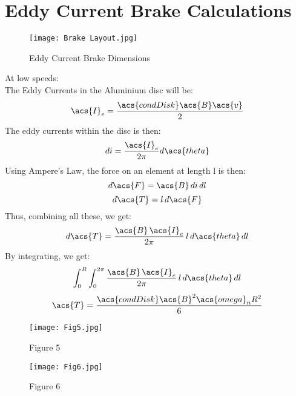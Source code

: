 \newpage
{} 
\setcounter{page}{1}
\appendix
\renewcommand\thechapter{A}

\chapter{Eddy Current Brake Calculations}

\begin{figure}[H]
	\begin{center}
		\texttt{[image: Brake Layout.jpg]}
		\caption{Eddy Current Brake Dimensions}
		\label{fig:EB}
	\end{center}
\end{figure}

\newpage

At low speeds:\\
The Eddy Currents in the Aluminium disc will be:
\[
\acs{I}_e = \frac{\acs{condDisk} \acs{B} \acs{v}}{2}
\]
The eddy currents within the disc is then:
\[
di = \frac{\acs{I}_e}{2 \pi} d\acs{theta}
\]
Using Ampere's Law, the force on an element at length l is then:
\[
d\acs{F} = \acs{B} \, di \, dl
\]
\[
d\acs{T} = l \, d\acs{F}
\]
Thus, combining all these, we get:
\[
d\acs{T} = \frac{\acs{B} \, \acs{I}_e}{2 \pi} \, l \, d\acs{theta} \, dl
\]
By integrating, we get:
\[
\int_{0}^{R} \int_{0}^{2 \pi} \frac{\acs{B} \, \acs{I}_e}{2 \pi} \, l \, d\acs{theta} \, dl
\]
\[
\acs{T} = \frac{\acs{condDisk}\acs{B}^2\acs{omega}_n R^2}{6}
\]

\begin{figure}[H]
	\begin{center}
		\texttt{[image: Fig5.jpg]}
		\caption{Figure 5}
		\label{fig:5}
	\end{center}
\end{figure}

\begin{figure}[H]
	\begin{center}
		\texttt{[image: Fig6.jpg]}
		\caption{Figure 6}
		\label{fig:6}
	\end{center}
\end{figure}